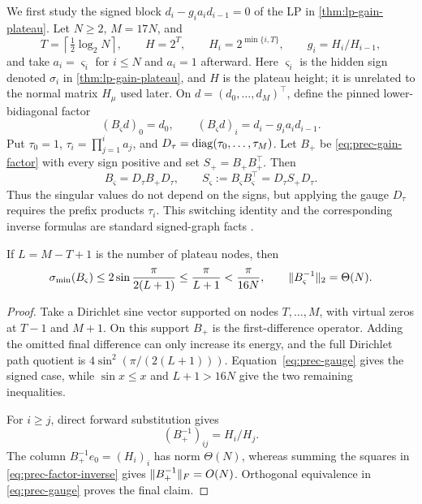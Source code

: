 We first study the signed block $d_i-g_ia_id_{i-1}=0$ of the LP in
\cref{thm:lp-gain-plateau}.  Let $N\geq2$, $M=17N$, and
\[
 T=\left\lceil\tfrac12\log_2N\right\rceil,
 \qquad H=2^T,\qquad H_i=2^{\min\{i,T\}},\qquad g_i=H_i/H_{i-1},
\]
and take $a_i=\varsigma_i$ for $i\leq N$ and $a_i=1$ afterward.  Here
$\varsigma_i$ is the hidden sign denoted $\sigma_i$ in
\cref{thm:lp-gain-plateau}, and \(H\) is the plateau height; it is unrelated to the normal matrix \(H_\mu\) used
later.  On $d=(d_0,\ldots,d_M)^\top$, define the pinned lower-bidiagonal factor
\begin{equation}
 (B_\varsigma d)_0=d_0,
 \qquad (B_\varsigma d)_i=d_i-g_ia_id_{i-1}.
 \label{eq:prec-gain-factor}
\end{equation}
Put $\tau_0=1$, $\tau_i=\prod_{j=1}^ia_j$, and
$D_\tau=\operatorname{diag}(\tau_0,\ldots,\tau_M)$.  Let $B_+$ be
\eqref{eq:prec-gain-factor} with every sign positive and set
$S_+=B_+B_+^\top$.  Then
\begin{equation}
 B_\varsigma=D_\tau B_+D_\tau,
 \qquad S_\varsigma:=B_\varsigma B_\varsigma^\top
 =D_\tau S_+D_\tau.
 \label{eq:prec-gauge}
\end{equation}
Thus the singular values do not depend on the signs, but applying the gauge
$D_\tau$ requires the prefix products $\tau_i$.  This switching identity and the
corresponding inverse formulas are standard signed-graph facts
\cite{alazemi2024-signed-graphs-and-inverses-of}.

\begin{lemma}
\label{lem:prec-small-singular}
If $L=M-T+1$ is the number of plateau nodes, then
\begin{equation}
 \sigma_{\min}(B_\varsigma)
 \leq2\sin\frac{\pi}{2(L+1)}
 \leq\frac{\pi}{L+1}<\frac{\pi}{16N},
 \qquad \lVert B_\varsigma^{-1}\rVert_2=\Theta(N).
 \label{eq:prec-small-singular}
\end{equation}
\end{lemma}

\begin{proof}
Take a Dirichlet sine vector supported on nodes $T,\ldots,M$, with virtual
zeros at $T-1$ and $M+1$.  On this support $B_+$ is the first-difference
operator.  Adding the omitted final difference can only increase its energy,
and the full Dirichlet path quotient is
$4\sin^2(\pi/(2(L+1)))$.  Equation~\eqref{eq:prec-gauge} gives the signed
case, while $\sin x\leq x$ and $L+1>16N$ give the two remaining inequalities.

For $i\geq j$, direct forward substitution gives
\begin{equation}
 (B_+^{-1})_{ij}=H_i/H_j.                    \label{eq:prec-factor-inverse}
\end{equation}
The column $B_+^{-1}e_0=(H_i)_i$ has norm $\Theta(N)$, whereas summing the
squares in \eqref{eq:prec-factor-inverse} gives
$\lVert B_+^{-1}\rVert_F=O(N)$.  Orthogonal equivalence in
\eqref{eq:prec-gauge} proves the final claim.
\end{proof}


